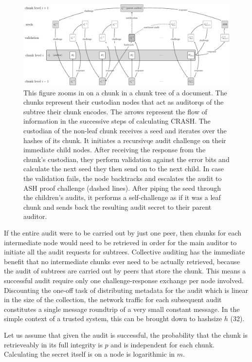 \documentclass[12pt]{article}
\begin{document}
\begin{figure}[htbp]
   \centering
   \includegraphics[scale=0.45]{../smash/fig/crash.pdf} %
   \caption{This figure zooms in on a chunk in a chunk tree of a document. The chunks represent their custodian nodes that act as auditorqs of the subtree their chunk encodes. The arrows represent the flow of information in the successive steps of calculating CRASH. The custodian of the non-leaf chunk receives a seed and iterates over the hashes of its chunk. It initiates a recursivqe audit challenge on their immediate child nodes. After receiving the response from the chunk's custodian, they perform validation against the error bits and calculate the next seed they then send on to the next child. In case the validation fails, the node backtracks and escalates the audit  to ASH proof challenge    (dashed lines). After piping the seed through the children's audits, it performs a self-challenge as if it was a leaf chunk and sends back the resulting audit secret to their parent auditor.
   }
   \label{fig:crash}
\end{figure}

If the entire audit were to be carried out by just one peer, then chunks for each intermediate node would need to be retrieved in order for the main auditor to initiate all the audit requests for subtrees. Collective auditing has the immediate benefit that no intermediate chunks ever need to be actually retrieved, because the audit of subtrees are carried out by peers that store the chunk. This means a successful audit require only one challenge-response exchange per node involved.
Discounting the one-off task of distributing metadata for the audit which is linear in the size of the collection, the network traffic for each subsequent audit
constitutes a single message roundtrip of a very small constant message.
In the simple context of a trusted system, this can be brought down to hashsize $h$ (32).

Let us assume that given the audit is successful, the probability that the chunk is retrieveably in its full integrity is $p$ and is independent for each chunk.
Calculating the secret itself is on a node is logarithmic in $m$.
\end{document}
